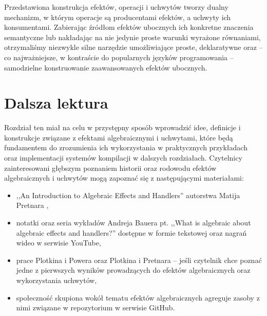 Przedstawiona konstrukcja efektów, operacji i uchwytów tworzy dualny mechanizm, w którym operacje są producentami efektów, a uchwyty ich konsumentami. Zabierając źródłom efektów ubocznych ich konkretne znaczenia semantyczne lub nakładając na nie jedynie proste warunki wyrażone równaniami, otrzymaliśmy niezwykle silne narzędzie umożliwiające proste, deklaratywne oraz -- co najważniejsze, w kontraście do popularnych języków programowania -- samodzielne konstruowanie zaawansowanych efektów ubocznych.

\section{Dalsza lektura}

Rozdział ten miał na celu w przystępny sposób wprowadzić idee, definicje i konstrukcje związane z efektami algebraicznymi i uchwytami, które będą fundamentem do zrozumienia ich wykorzystania w praktycznych przykładach oraz implementacji systemów kompilacji w dalszych rozdziałach. Czytelnicy zainteresowani głębszym poznaniem historii oraz rodowodu efektów algebraicznych i uchwytów mogą zapoznać się z następującymi materiałami:

\begin{itemize}
\item ,,An Introduction to Algebraic Effects and Handlers'' autorstwa Matija Pretnara \cite{pretnar2015introduction},
\item notatki oraz seria wykładów Andreja Bauera pt. ,,What is algebraic about algebraic effects and handlers?'' \cite{bauer2018algebraic} dostępne w formie tekstowej oraz nagrań wideo w serwisie YouTube,
\item prace Plotkina i Powera \cite{plotkin2001semantics, plotkin2002computational} oraz Plotkina i Pretnara \cite{plotkin2013handling} -- jeśli czytelnik chce poznać jedne z pierwszych wyników prowadzących do efektów algebraicznych oraz wykorzystania uchwytów,
\item społeczność skupiona wokół tematu efektów algebraicznych agreguje zasoby z nimi związane w repozytorium \cite{effectsbibliography} w serwisie GitHub.

\end{itemize}
